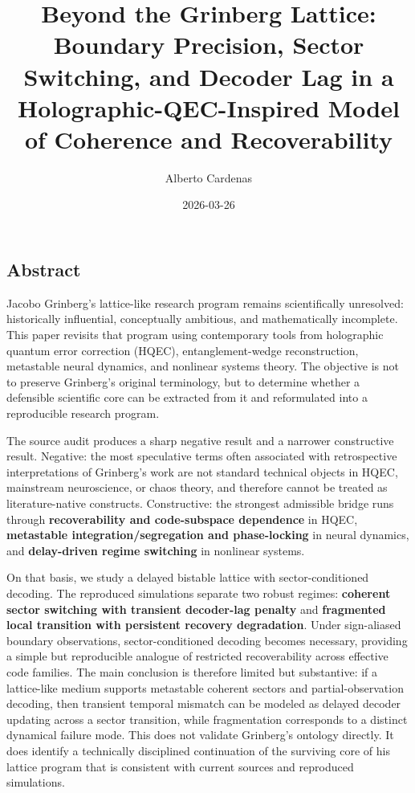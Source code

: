 \documentclass[
]{article}
\title{Beyond the Grinberg Lattice: Boundary Precision, Sector
Switching, and Decoder Lag in a Holographic-QEC-Inspired Model of
Coherence and Recoverability}
\author{Alberto Cardenas}
\date{2026-03-26}
\begin{document}
\maketitle

\subsection{Abstract}\label{abstract}

Jacobo Grinberg's lattice-like research program remains scientifically
unresolved: historically influential, conceptually ambitious, and
mathematically incomplete. This paper revisits that program using
contemporary tools from holographic quantum error correction (HQEC),
entanglement-wedge reconstruction, metastable neural dynamics, and
nonlinear systems theory. The objective is not to preserve Grinberg's
original terminology, but to determine whether a defensible scientific
core can be extracted from it and reformulated into a reproducible
research program.

The source audit produces a sharp negative result and a narrower
constructive result. Negative: the most speculative terms often
associated with retrospective interpretations of Grinberg's work are not
standard technical objects in HQEC, mainstream neuroscience, or chaos
theory, and therefore cannot be treated as literature-native constructs.
Constructive: the strongest admissible bridge runs through
\textbf{recoverability and code-subspace dependence} in HQEC,
\textbf{metastable integration/segregation and phase-locking} in neural
dynamics, and \textbf{delay-driven regime switching} in nonlinear
systems.

On that basis, we study a delayed bistable lattice with
sector-conditioned decoding. The reproduced simulations separate two
robust regimes: \textbf{coherent sector switching with transient
decoder-lag penalty} and \textbf{fragmented local transition with
persistent recovery degradation}. Under sign-aliased boundary
observations, sector-conditioned decoding becomes necessary, providing a
simple but reproducible analogue of restricted recoverability across
effective code families. The main conclusion is therefore limited but
substantive: if a lattice-like medium supports metastable coherent
sectors and partial-observation decoding, then transient temporal
mismatch can be modeled as delayed decoder updating across a sector
transition, while fragmentation corresponds to a distinct dynamical
failure mode. This does not validate Grinberg's ontology directly. It
does identify a technically disciplined continuation of the surviving
core of his lattice program that is consistent with current sources and
reproduced simulations.
\end{document}

